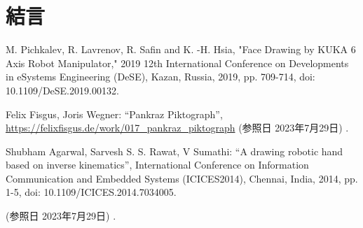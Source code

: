 \documentclass[10pt]{jarticle}
\begin{document}
	\section{結\hspace{2zw}言}%
   

    \vspace{5truemm}
    {\footnotesize
        \begin{thebibliography}{99}
            
            M. Pichkalev, R. Lavrenov, R. Safin and K. -H. Hsia, "Face Drawing by KUKA 6 Axis Robot Manipulator," 2019 12th International Conference on Developments in eSystems Engineering (DeSE), Kazan, Russia, 2019, pp. 709-714, doi: 10.1109/DeSE.2019.00132.

            Felix Fisgus, Joris Wegner: ``Pankraz Piktograph'', 
            \url{https://felixfisgus.de/work/017\_pankraz\_piktograph}
            (参照日 2023年7月29日) .
            
            Shubham Agarwal, Sarvesh S. S. Rawat, V Sumathi: ``A drawing robotic hand based on inverse kinematics'', 
            International Conference on Information Communication and Embedded Systems (ICICES2014), Chennai, India, 2014, pp. 1-5, doi: 10.1109/ICICES.2014.7034005.

			\url{}
            (参照日 2023年7月29日) .
            
            
        \end{thebibliography}
    }
    \normalsize
    
\end{document}

